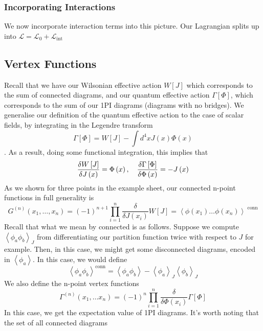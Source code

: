 \documentclass[11pt, oneside]{article}   	%
\theoremstyle{slanted}
\begin{document}
\subsubsection{Incorporating Interactions}
We now incorporate 
interaction terms into this picture. 
Our Lagrangian splits up into 
$ \mathcal{ L }  = \mathcal{ L }_ 0 + \mathcal{ L } _{\text{int}}$ 

\subsection{Vertex Functions}
Recall that we
have our Wilsonian effective 
action 
$ W \left[ J  \right]   $ 
which corresponds to the sum of connected diagrams, 
and our quantum effective action $ \Gamma \left[  \Phi  \right]  $, 
which corresponds to the sum of our 1PI 
diagrams (diagrams with no bridges). 
We generalise our definition of 
the quantum effective action to the 
case of scalar fields, by integrating in the 
Legendre transform
\[
\Gamma \left[ \Phi  \right]  = W \left[  J  \right]  
- \int d ^ 4 x J \left( x  \right) \Phi \left( x  \right)  
\]. As a result, doing some 
functional integration, this implies that 
\[
\fdv{W \left[  J  \right]   }{J \left( x  \right)  }
= \Phi \left( x  \right) , \quad 
\fdv{\Gamma \left[  \Phi  \right]  }{\Phi \left( x  \right) }
= - J \left( x  \right) 
\]  As we shown for three points in 
the example sheet, 
our connected n-point functions 
in full generality is 
\[
G ^{ \left( n  \right)   } 
\left( x_1 ,\dots , x_ n  \right)  
= \left( - 1  \right)  ^{ n + 1 } 
\prod_{ i = 1 } ^ n \frac{\delta }{ \delta J\left( x_ i  \right)  } 
W \left[  J  \right]   = 
\left< \phi \left( x_1  \right)  \dots \phi \left( x _ n  \right)   \right> 
^{ \text{ conn}}
\] Recall that what we mean by connected is as follows. 
Suppose we compute $ \left< \phi _ a \phi _ b  \right>_ J  $ 
from differentiating our partition function 
twice with respect to $ J $ for example. Then, 
in this case, we might get some disconnected diagrams, 
encoded in $ \left< \phi _ a  \right> $. In this case, we 
would define 
\[
\left< \phi _ a \phi _ b  \right> ^{ \text{conn}} = \left< 
\phi _ a \phi _ b  \right>  - \left< \phi _ a  \right> _ J \left< \phi _ b  \right> _ J 
\] We also define the 
n-point vertex functions 
\[
\Gamma ^{ \left( n  \right)  } \left( x_1, \dots x _ n  \right)  
= \left( - 1  \right)  ^{ n } \prod _{ i = 1 } ^ n 
\frac{\delta  }{ \delta \Phi \left( x _ i  \right)  } \Gamma \left[  \Phi  \right] 
\] In this case, 
we get the expectation value of 1PI diagrams. 
It's worth noting that the set of all connected diagrams 
\end{document}
